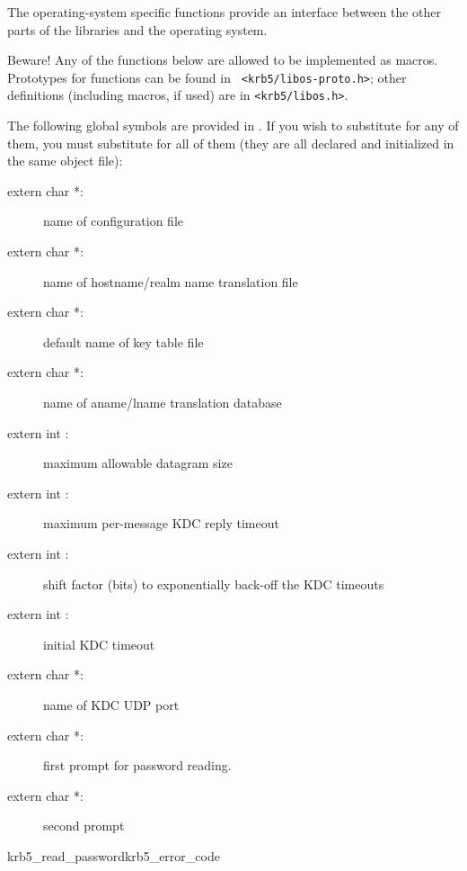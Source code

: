 The operating-system specific functions provide an interface between the
other parts of the  libraries and the operating system.

Beware! Any of the functions below are allowed to be implemented as
macros.  Prototypes for functions can be found in {\tt
<krb5/libos-proto.h>}; other definitions (including macros, if used) are
in {\tt <krb5/libos.h>}.

The following global symbols are provided in .  If you
wish to substitute for any of them, you must substitute for all of them
(they are all declared and initialized in the same object file):
\begin{description}
\item[extern char *:] name of configuration file
\item[extern char *:] name of hostname/realm
name translation file
\item[extern char *:] default name of key
table file
\item[extern char *:] name of aname/lname
translation database
\item[extern int :] maximum allowable
datagram size
\item[extern int :] maximum
per-message KDC reply timeout
\item[extern int :] shift factor
(bits) to exponentially back-off the KDC timeouts
\item[extern int :] initial KDC timeout
\item[extern char *:] name of KDC UDP port
\item[extern char *:] first prompt
for password reading.
\item[extern char *:] second prompt

\end{description}

\begin{funcdecl}{krb5_read_password}{krb5_error_code}{\funcin}
\funcout
{}
\funcinout
{}
\end{funcdecl}

